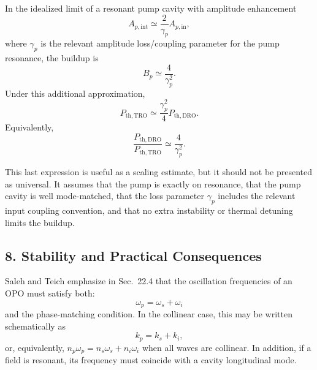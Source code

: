 \begin{resolucao}[Solution]
    In the idealized limit of a resonant pump cavity with amplitude enhancement
    \begin{equation}
        A_{p,\mathrm{int}}
        \simeq
        \frac{2}{\gamma_p}
        A_{p,\mathrm{in}},
        \label{eq:amplitude_enhancement_simple}
    \end{equation}
    where $\gamma_p$ is the relevant amplitude loss/coupling parameter for the pump resonance, the buildup is
    \begin{equation}
        B_p
        \simeq
        \frac{4}{\gamma_p^2}.
    \end{equation}
    Under this additional approximation,
    \begin{equation}
        \boxed{
        P_{\mathrm{th,TRO}}
        \simeq
        \frac{
            \gamma_p^2
        }{
            4
        }
        P_{\mathrm{th,DRO}}
        }.
        \label{eq:tro_threshold_simple}
    \end{equation}
    Equivalently,
    \begin{equation}
        \frac{
            P_{\mathrm{th,DRO}}
        }{
            P_{\mathrm{th,TRO}}
        }
        \simeq
        \frac{4}{\gamma_p^2}.
        \label{eq:dro_tro_ratio_simple}
    \end{equation}

    This last expression is useful as a scaling estimate, but it should not be presented as universal. It assumes that the pump is exactly on resonance, that the pump cavity is well mode-matched, that the loss parameter $\gamma_p$ includes the relevant input coupling convention, and that no extra instability or thermal detuning limits the buildup.

\subsection*{8. Stability and Practical Consequences}

    Saleh and Teich emphasize in Sec.~22.4 that the oscillation frequencies of an OPO must satisfy both:
    \begin{equation}
        \omega_p=\omega_s+\omega_i
        \label{eq:energy_conservation}
    \end{equation}
    and the phase-matching condition. In the collinear case, this may be written schematically as
    \begin{equation}
        k_p=k_s+k_i,
        \label{eq:phase_matching}
    \end{equation}
    or, equivalently, $n_p\omega_p=n_s\omega_s+n_i\omega_i$ when all waves are collinear. In addition, if a field is resonant, its frequency must coincide with a cavity longitudinal mode.


\end{resolucao}
